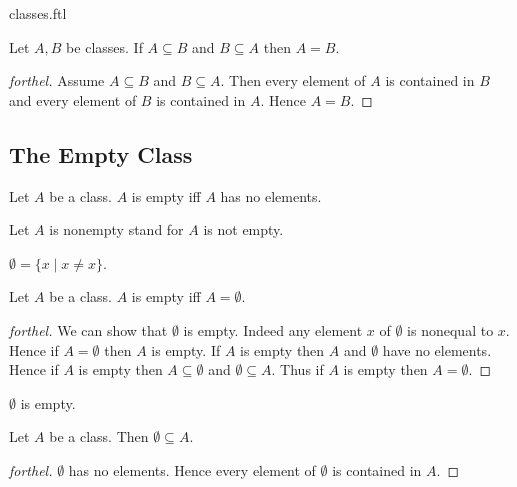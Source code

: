 \documentclass{naproche-library}
\begin{document}
\begin{smodule}{classes.ftl}
  \begin{proposition}[forthel,id=FOUNDATIONS_01_7159957847801856,printid]
    Let $A, B$ be classes.
    If $A \subseteq B$ and $B \subseteq A$ then $A = B$.
  \end{proposition}
  \begin{proof}[forthel]
    Assume $A \subseteq B$ and $B \subseteq A$.
    Then every element of $A$ is contained in $B$ and every element of $B$ is contained in $A$.
    Hence $A = B$.
  \end{proof}


  \subsection*{The Empty Class}

  \begin{definition}[forthel,id=FOUNDATIONS_01_6252477624090624,printid]
    Let $A$ be a class.
    $A$ is empty iff $A$ has no elements.

    Let $A$ is nonempty stand for $A$ is not empty.
  \end{definition}

  \begin{definition}[forthel,id=FOUNDATIONS_01_7939928493129728,printid]
    $\emptyset = \{ x \mid x \neq x \}$.
  \end{definition}

  \begin{proposition}[forthel,id=FOUNDATIONS_01_2263153161273344,printid]
    Let $A$ be a class.
    $A$ is empty iff $A = \emptyset$.
  \end{proposition}
  \begin{proof}[forthel]
    We can show that $\emptyset$ is empty.
    Indeed any element $x$ of $\emptyset$ is nonequal to $x$.
    Hence if $A = \emptyset$ then $A$ is empty.
    If $A$ is empty then $A$ and $\emptyset$ have no elements.
    Hence if $A$ is empty then $A \subseteq \emptyset$ and $\emptyset \subseteq A$.
    Thus if $A$ is empty then $A = \emptyset$.
  \end{proof}

  \begin{corollary}[forthel,id=FOUNDATIONS_01_1495141426659328,printid]
    $\emptyset$ is empty.
  \end{corollary}

  \begin{corollary}[forthel,id=FOUNDATIONS_01_6931785090859008,printid]
    Let $A$ be a class.
    Then $\emptyset \subseteq A$.
  \end{corollary}
  \begin{proof}[forthel]
    $\emptyset$ has no elements.
    Hence every element of $\emptyset$ is contained in $A$.
  \end{proof}



\end{smodule}
\end{document}
